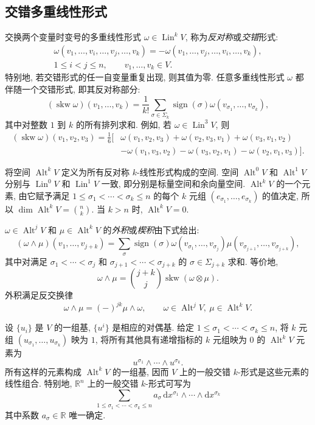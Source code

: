 \subsection{交错多重线性形式}\label{subsec:alternating-multilinear-forms}

交换两个变量时变号的多重线性形式 $\omega\in\operatorname{Lin}^kV$, 称为\emph{反对称}或\emph{交错}形式:
\[
\begin{gathered}
\omega(v_1,\ldots,v_i,\ldots,v_j,\ldots,v_k)=-\omega(v_1,\ldots,v_j,\ldots,v_i,\ldots,v_k),\\
1\leq i<j\leq n,\qquad v_1,\ldots,v_k\in V.
\end{gathered}
\]
特别地, 若交错形式的任一自变量重复出现, 则其值为零. 任意多重线性形式 $\omega$ 都伴随一个交错形式, 即其反对称部分:
\[
(\operatorname{skw}\omega)(v_1,\ldots,v_k)=\frac1{k!}\sum_{\sigma\in\Sigma_k}\operatorname{sign}(\sigma)\omega(v_{\sigma_1},\ldots,v_{\sigma_k}),
\]
其中对整数 $1$ 到 $k$ 的所有排列求和. 例如, 若 $\omega\in\operatorname{Lin}^3V$, 则
\[
\begin{aligned}
(\operatorname{skw}\omega)(v_1,v_2,v_3)=\frac16[&\omega(v_1,v_2,v_3)+\omega(v_2,v_3,v_1)+\omega(v_3,v_1,v_2)\\
&-\omega(v_1,v_3,v_2)-\omega(v_3,v_2,v_1)-\omega(v_2,v_1,v_3)].
\end{aligned}
\]

将空间 $\operatorname{Alt}^kV$ 定义为所有反对称 $k$-线性形式构成的空间. 空间 $\operatorname{Alt}^0V$ 和 $\operatorname{Alt}^1V$ 分别与 $\operatorname{Lin}^0V$ 和 $\operatorname{Lin}^1V$ 一致, 即分别是标量空间和余向量空间. $\operatorname{Alt}^kV$ 的一个元素, 由它赋予满足 $1\leq\sigma_1<\cdots<\sigma_k\leq n$ 的每个 $k$ 元组 $(e_{\sigma_1},\ldots,e_{\sigma_k})$ 的值决定, 所以 $\dim\operatorname{Alt}^kV=\binom nk$. 当 $k>n$ 时, $\operatorname{Alt}^kV=0$.

$\omega\in\operatorname{Alt}^jV$ 和 $\mu\in\operatorname{Alt}^kV$ 的\emph{外积}或\emph{楔积}由下式给出:
\[
(\omega\wedge\mu)(v_1,\ldots,v_{j+k})=\sum_\sigma\operatorname{sign}(\sigma)\omega(v_{\sigma_1},\ldots,v_{\sigma_j})\mu(v_{\sigma_{j+1}},\ldots,v_{\sigma_{j+k}}),
\]
其中对满足 $\sigma_1<\cdots<\sigma_j$ 和 $\sigma_{j+1}<\cdots<\sigma_{j+k}$ 的 $\sigma\in\Sigma_{j+k}$ 求和. 等价地,
\[
\omega\wedge\mu=\binom{j+k}j\operatorname{skw}(\omega\otimes\mu).
\]
外积满足反交换律
\[
\omega\wedge\mu=(-)^{jk}\mu\wedge\omega,\qquad\omega\in\operatorname{Alt}^jV,\ \mu\in\operatorname{Alt}^kV.
\]

设 $\{u_i\}$ 是 $V$ 的一组基, $\{u^i\}$ 是相应的对偶基. 给定 $1\leq\sigma_1<\cdots<\sigma_k\leq n$, 将 $k$ 元组 $(u_{\sigma_1},\ldots,u_{\sigma_k})$ 映为 $1$, 将所有其他具有递增指标的 $k$ 元组映为 $0$ 的 $\operatorname{Alt}^kV$ 元素为
\begin{equation}\label{eq:alternating-form-basis}
u^{\sigma_1}\wedge\cdots\wedge u^{\sigma_k}.
\end{equation}
所有这样的元素构成 $\operatorname{Alt}^kV$ 的一组基, 因而 $V$ 上的一般交错 $k$-形式是这些元素的线性组合. 特别地, $\mathbb R^n$ 上的一般交错 $k$-形式可写为
\[
\sum_{1\leq\sigma_1<\cdots<\sigma_k\leq n}a_\sigma\,\mathrm{d}x^{\sigma_1}\wedge\cdots\wedge \mathrm{d}x^{\sigma_k}
\]
其中系数 $a_\sigma\in\mathbb R$ 唯一确定.

